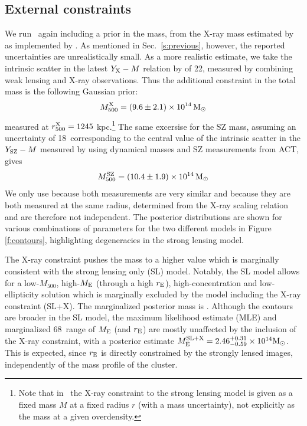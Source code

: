 \subsection{External constraints}\label{s:extra}

We run \lenstool\ again including a prior in the mass, from the X-ray mass estimated by 
\cite{planck11ix} as implemented by \cite{verdugo11}. As mentioned in Sec.\ \ref{s:previous}, 
however, the reported uncertainties are unrealistically small. As a more realistic estimate, we take 
the intrinsic scatter in the latest $Y_{\rm X}-M$ relation by \cite{mahdavi13} of 22\percent, measured by 
combining weak lensing and X-ray observations. Thus the additional constraint in the total mass is 
the following Gaussian prior:
\begin{equation}\label{eq:Mx}
 M_{500}^{\rm X} = (9.6\pm2.1)\times10^{14}\,{\rm M}_\odot
\end{equation}
measured at $r_{500}^{\rm X}=1245$ kpc.\footnote{Note that in \lenstool\ the X-ray constraint to the
strong lensing model is given as a fixed mass $M$ at a fixed radius $r$ (with a mass uncertainty),
not explicitly as the mass at a given overdensity.} The same excersise for the SZ mass, assuming an 
uncertainty of 18\percent\ corresponding to the central value of the intrinsic scatter in the $Y_{\rm SZ}-M$ 
measured by \cite{sifon13} using dynamical masses and SZ measurements from ACT, gives
\begin{equation}\label{eq:Msz}
 M_{500}^{\rm SZ} = (10.4\pm1.9)\times10^{14}\,{\rm M}_\odot
\end{equation}
We only use  because both measurements are very similar and because they are 
both measured at the same radius, determined from the X-ray scaling relation \citep{planck11ix} and
are therefore not independent. The posterior distributions are shown for various combinations of 
parameters for the two different models in Figure \ref{f:contours}, highlighting degeneracies in 
the strong lensing model.

The X-ray constraint pushes the mass to a higher value which is marginally consistent with the strong lensing only (SL) model. Notably, the SL model allows for a low-$M_{500}$, high-$M_{\rm E}$ (through a high $r_{\rm E}$), high-concentration and low-ellipticity solution which is marginally excluded by the model including the X-ray constraint (SL+X). The marginalized posterior mass is \mslx. Although the contours are broader in the SL model, the maximum likelihood estimate (MLE) and marginalized 68\percent\ range of $M_{\rm E}$ (and $r_{\rm E}$) are mostly unaffected by the inclusion of the X-ray constraint, with a posterior estimate $M_{\rm E}^{\rm SL+X}=2.46_{-0.59}^{+0.31}\times10^{14}{\rm M}_\odot$. This is expected, since $r_{\rm E}$ is directly constrained by the strongly lensed images, independently of the mass profile of the cluster.


